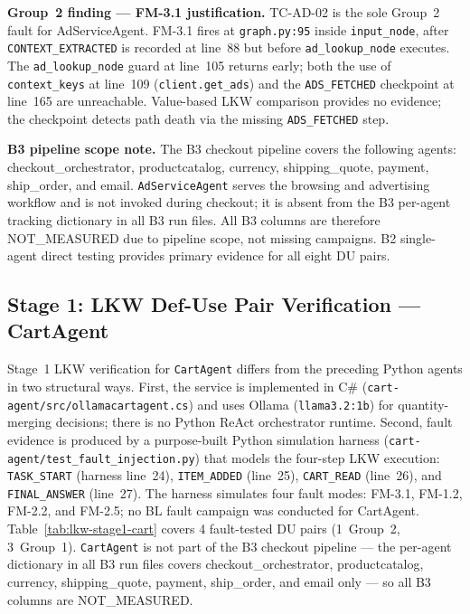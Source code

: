 \documentclass[sigconf,review,anonymous,balance=false]{acmart}
\begin{document}
\begin{table}[t]
\smallskip\par\noindent
\textbf{Group~2 finding --- FM-3.1 justification.}
TC-AD-02 is the sole Group~2 fault for AdServiceAgent.
FM-3.1 fires at \texttt{graph.py:95} inside \texttt{input\_node}, after
\texttt{CONTEXT\_EXTRACTED} is recorded at line~88 but before
\texttt{ad\_lookup\_node} executes.
The \texttt{ad\_lookup\_node} guard at line~105 returns early;
both the use of \texttt{context\_keys} at line~109
(\texttt{client.get\_ads}) and the \texttt{ADS\_FETCHED} checkpoint at
line~165 are unreachable.
Value-based LKW comparison provides no evidence;
the checkpoint detects path death via the missing \texttt{ADS\_FETCHED}
step.

\smallskip\par\noindent
\textbf{B3 pipeline scope note.}
The B3 checkout pipeline covers the following agents:
checkout\_orchestrator, productcatalog, currency, shipping\_quote, payment,
ship\_order, and email.
\texttt{AdServiceAgent} serves the browsing and advertising workflow and
is not invoked during checkout; it is absent from the B3 per-agent tracking
dictionary in all B3 run files.
All B3 columns are therefore NOT\_MEASURED due to pipeline scope, not missing
campaigns.
B2 single-agent direct testing provides primary evidence for all eight DU
pairs.
\end{table}

\subsection{Stage 1: LKW Def-Use Pair Verification --- CartAgent}
\label{sec:lkw-stage1-cart}

Stage~1 LKW verification for \texttt{CartAgent} differs from the preceding
Python agents in two structural ways.
First, the service is implemented in C\# (\texttt{cart-agent/src/ollamacartagent.cs})
and uses Ollama (\texttt{llama3.2:1b}) for quantity-merging decisions; there
is no Python ReAct orchestrator runtime.
Second, fault evidence is produced by a purpose-built Python simulation
harness (\texttt{cart-agent/test\_fault\_injection.py}) that models the four-step
LKW execution: \texttt{TASK\_START} (harness line~24), \texttt{ITEM\_ADDED}
(line~25), \texttt{CART\_READ} (line~26), and \texttt{FINAL\_ANSWER} (line~27).
The harness simulates four fault modes: FM-3.1, FM-1.2, FM-2.2, and FM-2.5;
no BL fault campaign was conducted for CartAgent.
Table~\ref{tab:lkw-stage1-cart} covers 4 fault-tested DU pairs (1~Group~2,
3~Group~1).
\texttt{CartAgent} is not part of the B3 checkout pipeline --- the per-agent
dictionary in all B3 run files covers checkout\_orchestrator, productcatalog,
currency, shipping\_quote, payment, ship\_order, and email only --- so all
B3 columns are NOT\_MEASURED.
\end{document}
